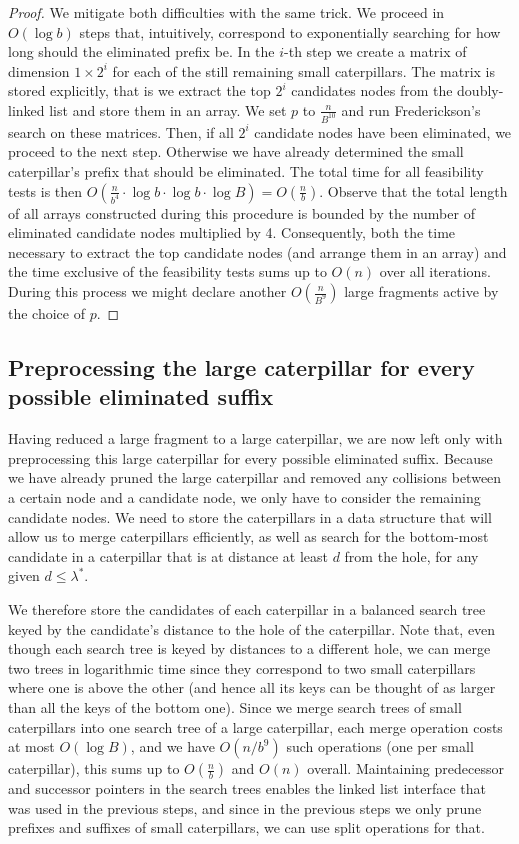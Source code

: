 \documentclass[11pt,a4paper]{article}
\theoremstyle{definition}
\theoremstyle{remark}
\begin{document}
\begin{proof}
We mitigate both difficulties with the same trick. We proceed in $O(\log b)$ steps that, intuitively, correspond
to exponentially searching for how long should the eliminated prefix be. In the $i$-th step we
create a matrix of dimension $1\times 2^{i}$ for each of the still remaining small caterpillars.
The matrix is stored explicitly, that is we extract the top $2^{i}$ candidates nodes from the doubly-linked
list and store them in an array. We set $p$ to $\frac{n}{B^{10}}$ and run Frederickson's search
on these matrices. Then, if all $2^{i}$ candidate nodes have been eliminated, we proceed to the next
step. Otherwise we have already determined the small caterpillar's prefix that should be eliminated. The total time for all feasibility tests is then
$O(\frac{n}{b^{4}}\cdot \log b \cdot \log b \cdot \log B) = O(\frac{n}{b})$. 
Observe that the total length of all arrays constructed during this procedure is bounded by the number
of eliminated candidate nodes multiplied by 4. Consequently, both the time necessary
to extract the top candidate nodes (and arrange them in an array) and the time exclusive of the feasibility tests sums up to $O(n)$
over all iterations. During this process we might declare another $O(\frac{n}{B^9})$ large fragments active
by the choice of $p$.
\end{proof}


\subsection{Preprocessing the large caterpillar for every possible eliminated suffix}\label{section:lemma4}

Having reduced a large fragment to a large caterpillar, we are now left only with preprocessing this large caterpillar for every possible eliminated suffix.
Because we have already pruned the large caterpillar and removed any collisions between a certain
node and a candidate node, we only have to consider the remaining candidate nodes.
We need to store the caterpillars in a data structure that will allow us to merge caterpillars efficiently, as well as search for the bottom-most candidate in a caterpillar that is at distance at least $d$ from the hole, for any given $d \le \lambda^*$. 

We therefore store the candidates of each caterpillar in a balanced search tree keyed by the candidate's distance to the hole of the caterpillar. Note that, even though each search tree is keyed by distances to a different hole, we can merge two trees in logarithmic time since they correspond to two small caterpillars where one is above the other (and hence all its keys can be thought of as larger than all the keys of the bottom one). Since we merge search trees of small caterpillars into one  search tree of a large caterpillar, each merge operation costs at most $O(\log B)$, and we have $O(n/b^9)$ such operations (one per small caterpillar), this sums up to $O(\frac{n}{b})$ and $O(n)$ overall.
Maintaining predecessor and successor pointers in the search trees enables the linked list interface that was used in the previous steps, and since in the previous steps we only prune prefixes and suffixes of small caterpillars, we can use split operations for that.
\end{document}

